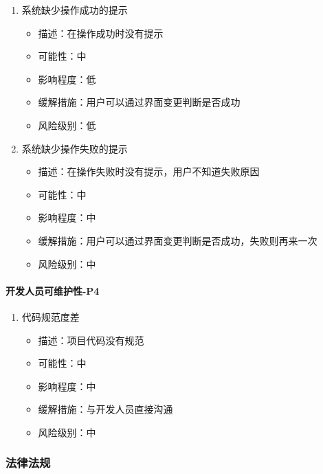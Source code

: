 \documentclass[hyperref, a4paper]{ctexart}
\providecommand{\tightlist}{%
  \setlength{\itemsep}{0pt}\setlength{\parskip}{0pt}}
\let\oldparagraph\paragraph
\renewcommand{\paragraph}[1]{\oldparagraph{#1}\mbox{}}
\begin{document}
\begin{enumerate}
\def\labelenumi{\arabic{enumi}.}
\tightlist
\item
  系统缺少操作成功的提示

  \begin{itemize}
  \tightlist
  \item
    描述：在操作成功时没有提示
  \item
    可能性：中
  \item
    影响程度：低
  \item
    缓解措施：用户可以通过界面变更判断是否成功
  \item
    风险级别：低
  \end{itemize}
\item
  系统缺少操作失败的提示

  \begin{itemize}
  \tightlist
  \item
    描述：在操作失败时没有提示，用户不知道失败原因
  \item
    可能性：中
  \item
    影响程度：中
  \item
    缓解措施：用户可以通过界面变更判断是否成功，失败则再来一次
  \item
    风险级别：中
  \end{itemize}
\end{enumerate}

\hypertarget{ux5f00ux53d1ux4ebaux5458ux53efux7ef4ux62a4ux6027-p4}{%
\paragraph{开发人员可维护性-P4}\label{ux5f00ux53d1ux4ebaux5458ux53efux7ef4ux62a4ux6027-p4}}

\begin{enumerate}
\def\labelenumi{\arabic{enumi}.}
\tightlist
\item
  代码规范度差

  \begin{itemize}
  \tightlist
  \item
    描述：项目代码没有规范
  \item
    可能性：中
  \item
    影响程度：中
  \item
    缓解措施：与开发人员直接沟通
  \item
    风险级别：中
  \end{itemize}
\end{enumerate}

\hypertarget{ux6cd5ux5f8bux6cd5ux89c4}{%
\subsubsection{法律法规}\label{ux6cd5ux5f8bux6cd5ux89c4}}
\end{document}
